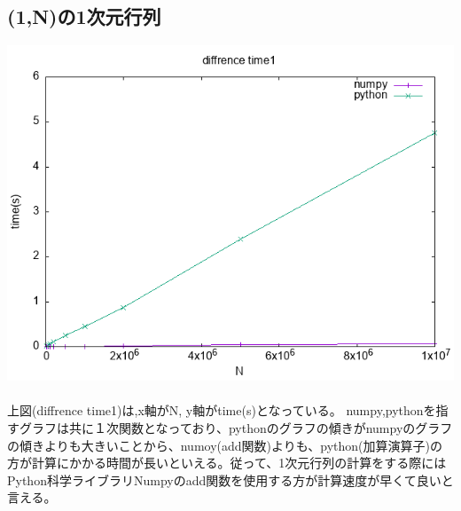 \documentclass[a4paper, 11pt, titlepage]{jsarticle}
\begin{document}
\subsection{(1,N)の1次元行列}
\includegraphics[width=15cm]{data1.png}\\
\\上図(diffrence time1)は,x軸がN, y軸がtime(s)となっている。
numpy,pythonを指すグラフは共に１次関数となっており、pythonのグラフの傾きがnumpyのグラフの傾きよりも大きいことから、numoy(add関数)よりも、python(加算演算子)の方が計算にかかる時間が長いといえる。従って、1次元行列の計算をする際にはPython科学ライブラリNumpyのadd関数を使用する方が計算速度が早くて良いと言える。
\clearpage
\end{document}
